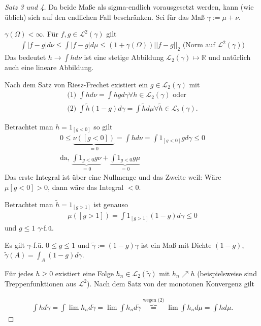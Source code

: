 \documentclass[]{article}
\begin{document}
\begin{proof}[Satz 3 und 4]
	Da beide Maße als sigma-endlich vorausgesetzt werden, kann (wie üblich) sich auf den endlichen Fall beschränken. Sei für das Maß $\gamma := \mu + \nu$.
	
	$\gamma(\Omega) < \infty$. Für $f,g \in \mathcal{L}^2(\gamma)$ gilt
	\begin{align*}
		\int |f-g| d\nu \leq \int |f-g| d\mu \leq (1+\gamma(\Omega)) ||f-g||_{2} \text{ (Norm auf } \mathcal{L}^2(\gamma) \text{)}
	\end{align*}
	Das bedeutet $h \rightarrow \int h d\nu$ ist eine stetige Abbildung $\mathcal{L}_2(\gamma) \mapsto \mathbb{R}$ und natürlich auch eine lineare Abbildung.
	
	Nach dem Satz von Riesz-Frechet existiert ein $g \in \mathcal{L}_2(\gamma)$ mit
	\begin{align*}
		\text{(1) } \int h d\nu = \int hg d\gamma \forall h \in \mathcal{L}_2(\gamma) \text{ oder} \\
		\text{(2) } \int \tilde{h}(1-g) d\gamma = \int \tilde{h} d\mu \forall \tilde{h} \in \mathcal{L}_2(\gamma).
	\end{align*}
	
	Betrachtet man $h=1_{[g<0]}$ so gilt
	\begin{align*}
		0 \leq \underbrace{\nu([g<0])}_{=0} = \int h d\nu = \int 1_{[g<0]}g d\gamma \leq 0\\
		\text{da, } \underbrace{\int 1_{g<0} g \nu}_{=0} + \underbrace{\int 1_{g<0} g \mu}_{=0}
	\end{align*}
	Das erste Integral ist über eine Nullmenge und das Zweite weil: Wäre $\mu[g < 0] > 0$, dann wäre das Integral $< 0$.
	
	Betrachtet man $\tilde{h} = 1_[g>1]$ ist genauso
	\begin{align*}
		\mu([g>1]) = \int 1_{[g>1]} (1-g) d\gamma \leq 0
	\end{align*}
	und $g\leq 1$ $\gamma$-f.ü.
	
	Es gilt $\gamma$-f.ü. $0 \leq g \leq 1$ und $\tilde{\gamma} := (1-g)\gamma$ ist ein Maß mit Dichte $(1-g)$, $\tilde{\gamma}(A) = \int_A (1-g) d\gamma$.
	
	Für jedes $h \geq 0$ existiert eine Folge $h_n \in \mathcal{L}_2(\tilde{\gamma})$ mit $h_n \nearrow h$ (beispielsweise sind Treppenfunktionen aus $\mathcal{L}^2$). Nach dem Satz von der monotonen Konvergenz gilt
	
	\begin{align*}
		\int h d\tilde{\gamma} = \int \lim h_n d\tilde{\gamma} = \lim \int h_n d\tilde{\gamma} \overbrace{=}^{\text{wegen (2)}} \lim \int h_n d\mu = \int h d\mu.
	\end{align*}
	

\end{proof}
\end{document}
